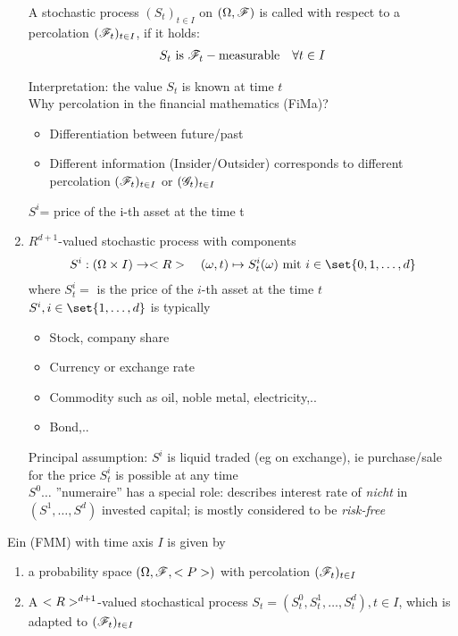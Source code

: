 \begin{enumerate}
	\begin{*example}
		A stochastic process $(S_t)_{t\in I}$ on $(\Omega,\mathscr F)$ is called  with respect to a percolation $(\mathscr F_t)_{t \in I}$, if it holds:
		\begin{align*}
			S_t \text{ is } \mathscr F_t-\text{measurable} \quad \forall t \in I
		\end{align*}
	\end{*example}
	Interpretation: the value $S_t$ is known at time $t$ \\
	Why percolation in the financial mathematics (FiMa)?
	\begin{itemize}
		\item Differentiation between future/past
		\item Different information (Insider/Outsider) corresponds to different percolation $(\mathscr F_t)_{t \in I}$ or $(\mathscr{G}_t)_{t\in I}$
	\end{itemize}
	$S^i$= price of the i-th asset at the time t
	\item {} $R^{d+1}$-valued  stochastic process with components
	\begin{align*}
		S^i: (\O \times I) \to \R\quad (\omega,t) \mapsto S^i_t(\omega) \mit i \in \set{0,1,\dots,d}
	\end{align*} 
	where $S^i_t=$ is the price of the $i$-th asset at the time $t$\\
	$S^i, i \in \set{1,\dots,d}$ is typically
	\begin{itemize}
		\item Stock, company share
		\item Currency or exchange rate
		\item Commodity such as oil, noble metal, electricity,..
		\item Bond,..
	\end{itemize}
	Principal assumption: $S^i$ is liquid traded (eg on exchange), ie purchase/sale for the price $S^i_t$ is possible at any time\\
	$S^0\dots$ ''numeraire'' has a special role: describes interest rate of \emph{nicht} in $(S^1,\dots,S^d)$ invested capital; is mostly considered to be \emph{risk-free}
\end{enumerate}
\begin{definition}
	Ein  (FMM) with time axis $I$ is given by
	\begin{enumerate}
		\item a probability space $(\Omega, \mathscr F,<P>)$ with percolation $(\mathscr F_t)_{t\in I}$
		\item A $<R>^{d+1}$-valued stochastical process $S_t = (S^0_t, S_t^1, \dots, S^d_t),t \in I$, which is adapted to $(\mathscr F_t)_{t \in I}$
	\end{enumerate} 
\end{definition}
